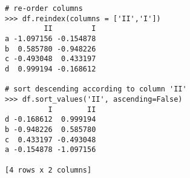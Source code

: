 \begin{lstlisting}
# re-order columns
>>> df.reindex(columns = ['II','I'])
         II         I
a -1.097156 -0.154878
b  0.585780 -0.948226
c -0.493048  0.433197
d  0.999194 -0.168612

# sort descending according to column 'II'
>>> df.sort_values('II', ascending=False)
          I        II
d -0.168612  0.999194
b -0.948226  0.585780
c  0.433197 -0.493048
a -0.154878 -1.097156

[4 rows x 2 columns]
\end{lstlisting}

\begin{comment}
\subsection*{Basic Statistical Functions}

The pandas library allows us to easily calculate basic summary statistics of our data,
useful when we want a quick description of the data.
The \li{describe()} function
outputs several such summary statistics for each column in a \li{DataFrame}:
\begin{lstlisting}
>>> df.describe()
              I        II
count  4.000000  4.000000
mean  -0.209630 -0.001308
std    0.566696  0.964083
min   -0.948226 -1.097156
25%   -0.363516 -0.644075
50%   -0.161745  0.046366
75%   -0.007859  0.689133
max    0.433197  0.999194

[8 rows x 2 columns]
\end{lstlisting}

Functions for calculating means and variances, the covariance and correlation matrices, and other
basic statistics are also available.
Below, we calculate the means of each row, as well as the
covariance matrix:
\begin{lstlisting}
>>> df.mean(axis=1)
a   -0.626017
b   -0.181223
c   -0.029925
d    0.415291
dtype: float64

>>> df.cov()
           I        II
I   0.321144 -0.256229
II -0.256229  0.929456

[2 rows x 2 columns]
\end{lstlisting}
\end{comment}


